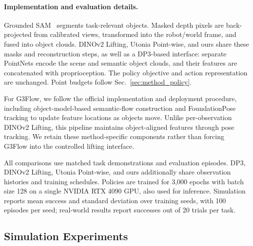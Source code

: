 \paragraph{Implementation and evaluation details.}
Grounded SAM~\cite{ren2024groundedsam} segments task-relevant objects. Masked depth pixels are back-projected from calibrated views, transformed into the robot/world frame, and fused into object clouds. DINOv2 Lifting, Utonia Point-wise, and ours share these masks and reconstruction steps, as well as a DP3-based interface: separate PointNets encode the scene and semantic object clouds, and their features are concatenated with proprioception. The policy objective and action representation are unchanged. Point budgets follow Sec.~\ref{sec:method_policy}.

For G3Flow, we follow the official implementation and deployment procedure, including object-model-based semantic-flow construction and FoundationPose tracking to update feature locations as objects move. Unlike per-observation DINOv2 Lifting, this pipeline maintains object-aligned features through pose tracking. We retain these method-specific components rather than forcing G3Flow into the controlled lifting interface.

All comparisons use matched task demonstrations and evaluation episodes. DP3, DINOv2 Lifting, Utonia Point-wise, and ours additionally share observation histories and training schedules. Policies are trained for 3,000 epochs with batch size 128 on a single NVIDIA RTX 4090 GPU, also used for inference. Simulation reports mean success and standard deviation over training seeds, with 100 episodes per seed; real-world results report successes out of 20 trials per task. 





\subsection{Simulation Experiments}
\label{sec:simulation_results}

